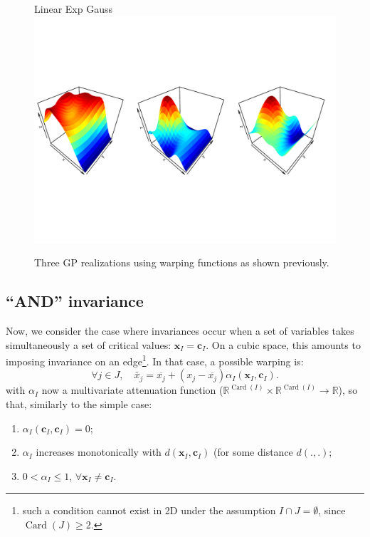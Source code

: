 \documentclass[a4paper,10pt]{article}
\newcommand{\x}{\mathbf{x}}
\newcommand{\cc}{\mathbf{c}}
\newcommand{\Rset}{\mathbb{R}}
\def\card{\operatorname{Card}}
\begin{document}
\begin{figure}[!ht]
\centering
Linear \hspace{4cm} Exp \hspace{4cm} Gauss
 \includegraphics[trim=2mm 45mm 2mm 45mm,clip, width=\textwidth]{simu2Dsimple.pdf}
 \caption{Three GP realizations using warping functions as shown previously.}\label{fig:simu2Dsimple}
\end{figure}

% 

\subsection{``AND'' invariance}
Now, we consider the case where invariances occur when a set of variables takes simultaneously a set of critical values: $\x_I = \cc_I$.
On a cubic space, this amounts to imposing invariance on an edge\footnote{such a condition 
cannot exist in 2D under the assumption $I \cap J = \emptyset$, since $\card(J) \geq 2$.}. In that case, a possible warping is:
\begin{equation}
 \forall j \in J, \quad \widetilde{x_j} = \overline{x_j} + \left( x_j - \overline{x_j}\right) {\alpha_I}(\x_I, \cc_I)\label{eq:and}.
\end{equation}
with ${\alpha_I}$ now a multivariate attenuation function ($\Rset^{\card(I)} \times \Rset^{\card(I)} \rightarrow \Rset$), so that, similarly to the simple case: 
\begin{enumerate}
 \item $\alpha_I(\cc_I, \cc_I) = 0$;
 \item $\alpha_I$ increases monotonically with $d(\x_I, \cc_I)$ (for some distance $d(.,.)$;
 \item $0 < \alpha_I \leq 1$, $\forall \x_I \neq \cc_I$.
\end{enumerate}
\end{document}
